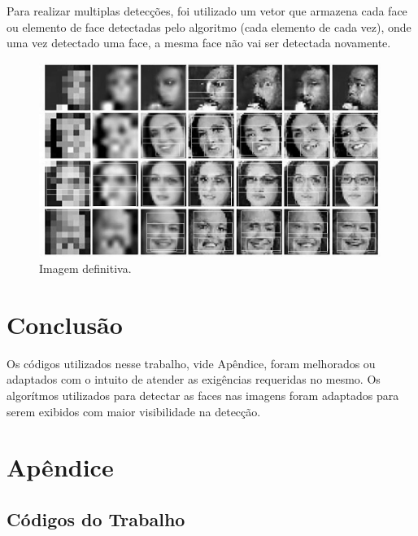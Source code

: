\documentclass{article}
\begin{document}
	Para realizar multiplas detecções, foi utilizado um vetor que armazena cada face ou elemento de face detectadas pelo algoritmo (cada elemento de cada vez), onde uma vez detectado uma face, a mesma face não vai ser detectada novamente.
	\begin{figure}
		\centering
		\includegraphics[scale = 0.4]{Face_track1.jpg}
		\caption{Imagem definitiva.}
	\end{figure}
	
	\newpage
	\section{Conclusão}
	Os códigos utilizados nesse trabalho, vide Apêndice, foram melhorados ou adaptados com o intuito de atender as exigências requeridas no mesmo. Os algorítmos utilizados para detectar as faces nas imagens foram adaptados para serem exibidos com maior visibilidade na detecção.
	\newpage
	\section{Apêndice}
	\subsection{Códigos do Trabalho}
\end{document}

